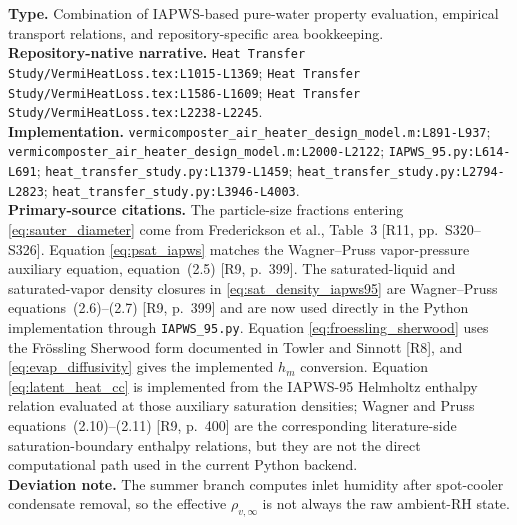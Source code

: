 \documentclass[11pt]{article}
\newcommand{\srcref}[1]{\nolinkurl{#1}}
\newcommand{\filepath}[1]{\nolinkurl{#1}}
\begin{document}
\textbf{Type.} Combination of IAPWS-based pure-water property evaluation, empirical transport relations, and repository-specific area bookkeeping. \\
\textbf{Repository-native narrative.} \filepath{Heat Transfer Study/VermiHeatLoss.tex:L1015-L1369}; \filepath{Heat Transfer Study/VermiHeatLoss.tex:L1586-L1609}; \filepath{Heat Transfer Study/VermiHeatLoss.tex:L2238-L2245}. \\
\textbf{Implementation.} \srcref{vermicomposter_air_heater_design_model.m:L891-L937}; \srcref{vermicomposter_air_heater_design_model.m:L2000-L2122}; \srcref{IAPWS_95.py:L614-L691}; \srcref{heat_transfer_study.py:L1379-L1459}; \srcref{heat_transfer_study.py:L2794-L2823}; \srcref{heat_transfer_study.py:L3946-L4003}. \\
\textbf{Primary-source citations.} The particle-size fractions entering \eqref{eq:sauter_diameter} come from Frederickson et al., Table~3 [R11, pp.~S320--S326]. Equation \eqref{eq:psat_iapws} matches the Wagner--Pruss vapor-pressure auxiliary equation, equation~(2.5) [R9, p.~399]. The saturated-liquid and saturated-vapor density closures in \eqref{eq:sat_density_iapws95} are Wagner--Pruss equations~(2.6)--(2.7) [R9, p.~399] and are now used directly in the Python implementation through \filepath{IAPWS_95.py}. Equation \eqref{eq:froessling_sherwood} uses the Fr\"ossling Sherwood form documented in Towler and Sinnott [R8], and \eqref{eq:evap_diffusivity} gives the implemented \(h_m\) conversion. Equation \eqref{eq:latent_heat_cc} is implemented from the IAPWS-95 Helmholtz enthalpy relation evaluated at those auxiliary saturation densities; Wagner and Pruss equations~(2.10)--(2.11) [R9, p.~400] are the corresponding literature-side saturation-boundary enthalpy relations, but they are not the direct computational path used in the current Python backend. \\
\textbf{Deviation note.} The summer branch computes inlet humidity after spot-cooler condensate removal, so the effective \(\rho_{v,\infty}\) is not always the raw ambient-RH state.
\end{document}
